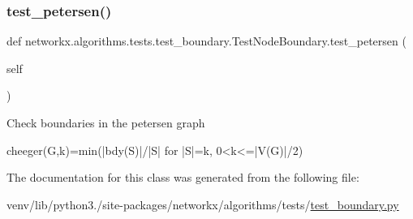 \mbox{\label{classnetworkx_1_1algorithms_1_1tests_1_1test__boundary_1_1TestNodeBoundary_a1dbef4a71b11ac2117ccc5de97b04e19}} 
\subsubsection{\texorpdfstring{test\+\_\+petersen()}{test\_petersen()}}
{\footnotesize\ttfamily def networkx.\+algorithms.\+tests.\+test\+\_\+boundary.\+Test\+Node\+Boundary.\+test\+\_\+petersen (\begin{DoxyParamCaption}\item[{}]{self }\end{DoxyParamCaption})}

\begin{DoxyVerb}Check boundaries in the petersen graph

cheeger(G,k)=min(|bdy(S)|/|S| for |S|=k, 0<k<=|V(G)|/2)\end{DoxyVerb}
 

The documentation for this class was generated from the following file\+:\begin{DoxyCompactItemize}
\item 
venv/lib/python3./site-\/packages/networkx/algorithms/tests/\hyperlink{test__boundary_8py}{test\+\_\+boundary.\+py}\end{DoxyCompactItemize}
